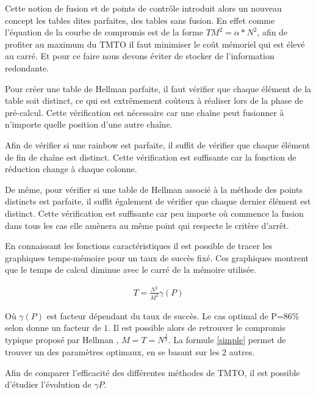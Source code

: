	Cette notion de fusion et de points de contrôle introduit alors un nouveau concept les tables dites parfaites, des tables sans fusion. En effet comme l'équation de la courbe de compromis est de la forme $TM^2=\alpha *N^2$, afin de profiter au maximum du \gls{TMTO} il faut minimiser le coût mémoriel qui est élevé au carré. Et pour ce faire nous devons éviter de stocker de l'information redondante.

	\bigskip

	Pour créer une table de Hellman parfaite, il faut vérifier que chaque élément de la table soit distinct, ce qui est extrêmement coûteux à réaliser lors de la phase de pré-calcul. Cette vérification est nécessaire car une chaîne peut fusionner à n'importe quelle position d'une autre chaîne.

	\bigskip

	Afin de vérifier si une \gls{rainbow} est parfaite, il suffit de vérifier que chaque élément de fin de chaîne est distinct. Cette vérification est suffisante car la fonction de réduction change à chaque colonne.

	\bigskip

	De même, pour vérifier si une table de Hellman associé à la méthode des points distincts est parfaite, il suffit également de vérifier que chaque dernier élément est distinct. Cette vérification est suffisante car peu importe où commence la fusion dans tous les cas elle amènera au même point qui respecte le critère d'arrêt.


	En connaissant les fonctions caractéristiques il est possible de tracer les graphiques temps-mémoire pour un taux de succès fixé. Ces graphiques montrent que le temps de calcul diminue avec le carré de la mémoire utilisée.

	\begin{align*}
		\label{simple}
		T=\frac{N^2}{M^2}\gamma(P)
	\end{align*}

	Où $\gamma(P)$ est facteur dépendant du taux de succès. Le cas optimal de P=86\% selon \cite{checkpoints} donne un facteur de $1$. Il est possible alors de retrouver le compromis typique proposé par Hellman \cite{ehellman}, $M=T=N^{\frac{2}{3}}$. La formule \ref{simple} permet de trouver un des paramètres optimaux, en se basant sur les 2 autres.

	\bigskip

	Afin de comparer l'efficacité des différentes méthodes de \gls{TMTO}, il est possible d'étudier l'évolution de $\gamma{P}$.

